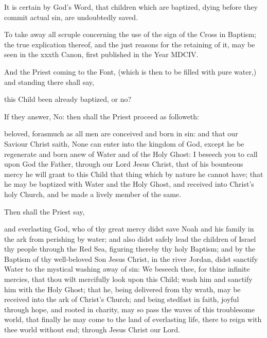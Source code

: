 \begin{rubric}
It is certain by God's Word, that children which are baptized, dying before they commit actual sin, are undoubtedly saved.
\end{rubric}

\begin{rubric}
To take away all scruple concerning the use of the sign of the Cross in Baptism; the true explication thereof, and the just reasons for the retaining of it, may be seen in the xxxth Canon, first published in the Year MDCIV.
\end{rubric}

\normalsize

\newpage

\begin{rubric}
And the Priest coming to the Font, (which is then to be filled with pure water,) and standing there shall say,
\end{rubric}

 this Child been already baptized, or no?
\\

\begin{rubric}
If they answer, No: then shall the Priest proceed as followeth:
\end{rubric}

 beloved, forasmuch as all men are conceived and born in sin: and that our Saviour Christ saith, None can enter into the kingdom of God, except he be regenerate and born anew of Water and of the Holy Ghost: I beseech you to call upon God the Father, through our Lord Jesus Christ, that of his bounteous mercy he will grant to this Child that thing which by nature he cannot have; that he may be baptized with Water and the Holy Ghost, and received into Christ's holy Church, and be made a lively member of the same.

\begin{rubric}
Then shall the Priest say,
\end{rubric}


 and everlasting God, who of thy great mercy didst save Noah and his family in the ark from perishing by water; and also didst safely lead the children of Israel thy people through the Red Sea, figuring thereby thy holy Baptism; and by the Baptism of thy well-beloved Son Jesus Christ, in the river Jordan, didst sanctify Water to the mystical washing away of sin: We beseech thee, for thine infinite mercies, that thou wilt mercifully look upon this Child; wash him and sanctify him with the Holy Ghost; that he, being delivered from thy wrath, may be received into the ark of Christ's Church; and being stedfast in faith, joyful through hope, and rooted in charity, may so pass the waves of this troublesome world, that finally he may come to the land of everlasting life, there to reign with thee world without end; through Jesus Christ our Lord.

